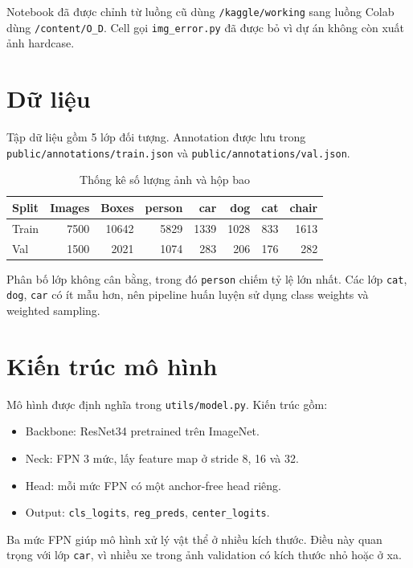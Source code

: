 \documentclass[12pt,a4paper]{article}
\begin{document}
Notebook đã được chỉnh từ luồng cũ dùng \texttt{/kaggle/working} sang luồng Colab dùng \texttt{/content/O\_D}. Cell gọi \texttt{img\_error.py} đã được bỏ vì dự án không còn xuất ảnh hardcase.

\section{Dữ liệu}

Tập dữ liệu gồm 5 lớp đối tượng. Annotation được lưu trong \texttt{public/annotations/train.json} và \texttt{public/annotations/val.json}.

\begin{table}[h]
\centering
\caption{Thống kê số lượng ảnh và hộp bao}
\begin{tabular}{lrrrrrrr}
\toprule
Split & Images & Boxes & person & car & dog & cat & chair \\
\midrule
Train & 7500 & 10642 & 5829 & 1339 & 1028 & 833 & 1613 \\
Val & 1500 & 2021 & 1074 & 283 & 206 & 176 & 282 \\
\bottomrule
\end{tabular}
\end{table}

Phân bố lớp không cân bằng, trong đó \texttt{person} chiếm tỷ lệ lớn nhất. Các lớp \texttt{cat}, \texttt{dog}, \texttt{car} có ít mẫu hơn, nên pipeline huấn luyện sử dụng class weights và weighted sampling.

\section{Kiến trúc mô hình}

Mô hình được định nghĩa trong \texttt{utils/model.py}. Kiến trúc gồm:

\begin{itemize}
  \item Backbone: ResNet34 pretrained trên ImageNet.
  \item Neck: FPN 3 mức, lấy feature map ở stride 8, 16 và 32.
  \item Head: mỗi mức FPN có một anchor-free head riêng.
  \item Output: \texttt{cls\_logits}, \texttt{reg\_preds}, \texttt{center\_logits}.
\end{itemize}

Ba mức FPN giúp mô hình xử lý vật thể ở nhiều kích thước. Điều này quan trọng với lớp \texttt{car}, vì nhiều xe trong ảnh validation có kích thước nhỏ hoặc ở xa.
\end{document}
